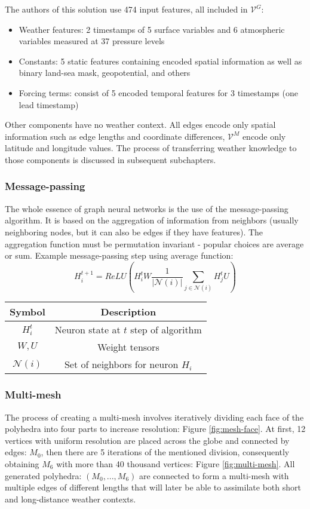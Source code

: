 \noindent The authors of this solution use 474 input features, all included in $\mathcal{V}^{G}$:
\begin{itemize}
    \item Weather features: 2 timestamps of 5 surface variables and 6 atmospheric variables measured at 37 pressure levels
    \item Constants: 5 static features containing encoded spatial information as well as binary land-sea mask, geopotential, and others
    \item Forcing terms: consist of 5 encoded temporal features for 3 timestamps (one lead timestamp)
\end{itemize}

\noindent Other components have no weather context. All edges encode only spatial information such as edge lengths and coordinate differences, $\mathcal{V}^M$ encode only latitude and longitude values. The process of transferring weather knowledge to those components is discussed in subsequent subchapters.

\subsubsection{Message-passing} 
The whole essence of graph neural networks is the use of the message-passing algorithm. It is based on the aggregation of information from neighbors (usually neighboring nodes, but it can also be edges if they have features). The aggregation function must be permutation invariant - popular choices are average or sum. Example message-passing step using average function:
\[
    H_i^{t+1} = ReLU(H_i^t W \frac{1}{|\mathcal{N}(i)|} \sum_{j \in \mathcal{N}(i)} H_j^t U)
\]
\begin{table}[!h]
    \centering
    \begin{tabular}{|c|c|}
        \hline
        Symbol & Description \\
        \hline
        $H_i^t$& Neuron state at $t$ step of algorithm \\
        $W,U$ & Weight tensors \\
        $\mathcal{N}(i)$ & Set of neighbors for neuron $H_i$ \\
        \hline
    \end{tabular}
\end{table}

\subsubsection{Multi-mesh}\label{chap:multi-mesh}
The process of creating a multi-mesh involves iteratively dividing each face of the polyhedra into four parts to increase resolution: Figure \ref{fig:mesh-face}. At first, 12 vertices with uniform resolution are placed across the globe and connected by edges: $M_0$, then there are 5 iterations of the mentioned division, consequently obtaining $M_6$ with more than 40 thousand vertices: Figure \ref{fig:multi-mesh}. All generated polyhedra: $(M_0,..., M_6)$ are connected to form a multi-mesh with multiple edges of different lengths that will later be able to assimilate both short and long-distance weather contexts. \\

